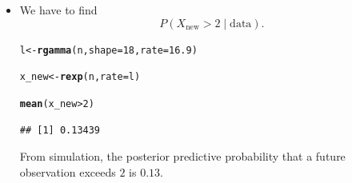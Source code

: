 \documentclass[11pt, a4paper]{article}\usepackage[]{graphicx}\usepackage[]{xcolor}
\makeatletter
\newcommand{\hlnum}[1]{\textcolor[rgb]{0.686,0.059,0.569}{#1}}%
\newcommand{\hlopt}[1]{\textcolor[rgb]{0,0,0}{#1}}%
\newcommand{\hldef}[1]{\textcolor[rgb]{0.345,0.345,0.345}{#1}}%
\newcommand{\hlkwb}[1]{\textcolor[rgb]{0.69,0.353,0.396}{#1}}%
\newcommand{\hlkwc}[1]{\textcolor[rgb]{0.333,0.667,0.333}{#1}}%
\newcommand{\hlkwd}[1]{\textcolor[rgb]{0.737,0.353,0.396}{\textbf{#1}}}%
\newenvironment{kframe}{%
 \def\at@end@of@kframe{}%
 \ifinner\ifhmode%
  \def\at@end@of@kframe{\end{minipage}}%
  \begin{minipage}{\columnwidth}%
 \fi\fi%
 \def\FrameCommand##1{\hskip\@totalleftmargin \hskip-\fboxsep
 \colorbox{shadecolor}{##1}\hskip-\fboxsep
     \hskip-\linewidth \hskip-\@totalleftmargin \hskip\columnwidth}%
 \MakeFramed {\advance\hsize-\width
   \@totalleftmargin\z@ \linewidth\hsize
   \@setminipage}}%
 {\par\unskip\endMakeFramed%
 \at@end@of@kframe}
\newenvironment{knitrout}{}{} %
\makeatother
\begin{document}
\newpage

\begin{itemize}
\item[\scalebox{2.0}{\twemoji{keycap: 5}}] \hspace{0.3cm} We have to find $$P(X_{\text{new}} > 2 \mid \text{data}).$$

\begin{knitrout}
\color{fgcolor}\begin{kframe}
\begin{alltt}
\hldef{l} \hlkwb{<-} \hlkwd{rgamma}\hldef{(n,} \hlkwc{shape} \hldef{=} \hlnum{18}\hldef{,} \hlkwc{rate} \hldef{=} \hlnum{16.9}\hldef{)}

\hldef{x_new} \hlkwb{<-} \hlkwd{rexp}\hldef{(n,} \hlkwc{rate} \hldef{= l)}

\hlkwd{mean}\hldef{(x_new} \hlopt{>} \hlnum{2}\hldef{)}
\end{alltt}
\begin{verbatim}
## [1] 0.13439
\end{verbatim}
\end{kframe}
\end{knitrout}

From simulation, the posterior predictive probability that a future observation exceeds $2$ is $0.13$.

\end{itemize}
\end{document}
